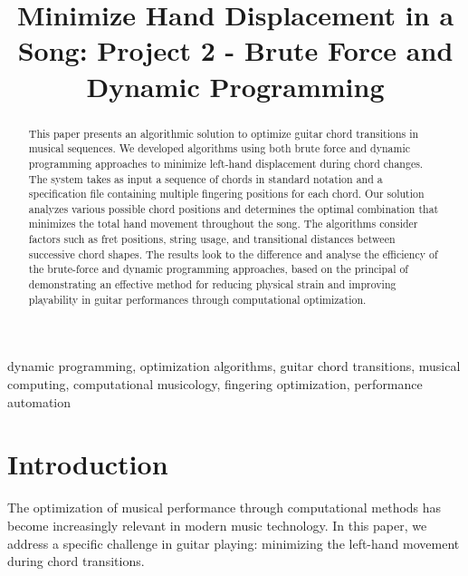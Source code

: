 \documentclass[conference]{IEEEtran}
\begin{document}
\title{Minimize Hand Displacement in a Song: Project 2 - Brute Force and Dynamic Programming}


\author{
\and
{}
}

\maketitle

\begin{abstract}
This paper presents an algorithmic solution to optimize guitar chord transitions in musical sequences. We developed algorithms using both brute force and dynamic programming approaches to minimize left-hand displacement during chord changes. The system takes as input a sequence of chords in standard notation and a specification file containing multiple fingering positions for each chord. Our solution analyzes various possible chord positions and determines the optimal combination that minimizes the total hand movement throughout the song. The algorithms consider factors such as fret positions, string usage, and transitional distances between successive chord shapes. The results look to the difference and analyse the efficiency of the brute-force and dynamic programming approaches, based on the principal of demonstrating an effective method for reducing physical strain and improving playability in guitar performances through computational optimization.
\end{abstract}

\begin{IEEEkeywords}
dynamic programming, optimization algorithms, guitar chord transitions, musical computing, computational musicology, fingering optimization, performance automation
\end{IEEEkeywords}

\section{Introduction}
The optimization of musical performance through computational methods has become increasingly relevant in modern music technology. In this paper, we address a specific challenge in guitar playing: minimizing the left-hand movement during chord transitions.
\end{document}

